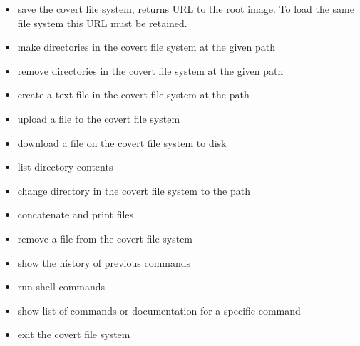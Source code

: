 \documentclass[letterpaper,12pt,openany,oneside]{sphinxmanual}
\begin{document}
\begin{itemize}
\begin{itemize}
\item {} 
 save the covert file system, returns URL to the root image. To load the same file system this URL must be retained.

\item {} 
 make directories in the covert file system at the given path

\item {} 
 remove directories in the covert file system at the given path

\item {} 
 create a text file in the covert file system at the path

\item {} 
 upload a file to the covert file system

\item {} 
 download a file on the covert file system to disk

\item {} 
 list directory contents

\item {} 
 change directory in the covert file system to the path

\item {} 
 concatenate and print files

\item {} 
 remove a file from the covert file system

\item {} 
 show the history of previous commands

\item {} 
 run shell commands

\item {} 
 show list of commands or documentation for a specific command

\item {} 
 exit the covert file system

\end{itemize}

\end{itemize}
\end{document}
